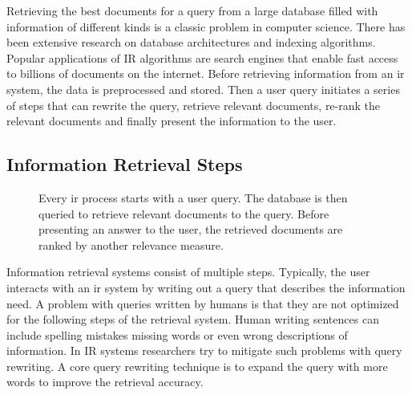 \documentclass[../main.tex]{subfiles}
\begin{document}
Retrieving the best documents for a query from a large database
filled with information of different kinds is a classic problem in computer science.
There has been extensive research on database architectures and indexing algorithms.
Popular applications of IR algorithms are search engines
that enable fast access to billions of documents on the internet.
Before retrieving information from an \gls{ir} system,
the data is preprocessed and stored.
Then a user query initiates a series of steps that can rewrite the query,
retrieve relevant documents,
re-rank the relevant documents and finally present the information to the user.

\subsection{Information Retrieval Steps}

\begin{figure}[t]
    \centering
    \caption{Every \gls{ir} process starts with a user query.
        The database is then queried to retrieve relevant documents to the query.
        Before presenting an answer to the user, the retrieved documents are ranked by another relevance measure.}
    \label{fig:ir_steps}
\end{figure}
Information retrieval systems consist of multiple steps.
Typically, the user interacts with an \gls{ir} system
by writing out a query that describes the information need.
A problem with queries written by humans is that they are not optimized for the following steps of the retrieval system.
Human writing sentences can include spelling mistakes missing words or even wrong descriptions of information.
In IR systems researchers try to mitigate such problems with query rewriting.
A core query rewriting technique is to expand the query with more words to improve the retrieval accuracy.
\end{document}
